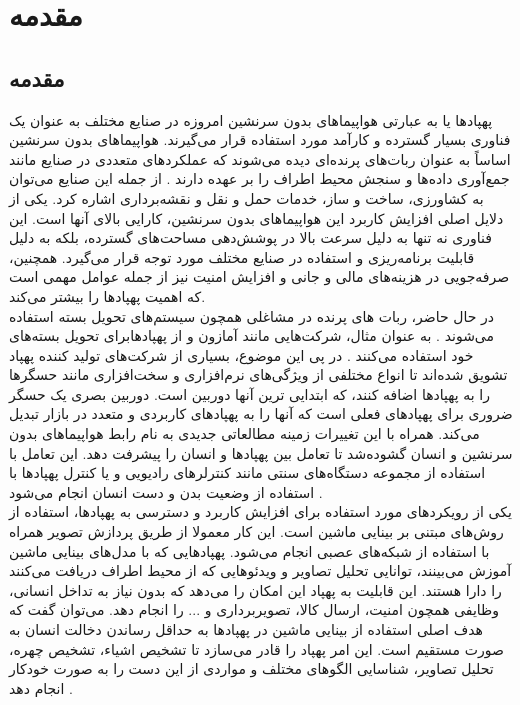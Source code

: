 \chapter{مقدمه}
\section{مقدمه}
پهپاد‌ها یا به عبارتی هواپیماهای بدون سرنشین امروزه در صنایع مختلف به عنوان یک فناوری
 ‌بسیار گسترده و کارآمد مورد استفاده قرار می‌گیرند. هواپیماهای بدون سرنشین اساساً به عنوان ربات‌های پرنده‌ای
 دیده می‌شوند که عملکردهای متعددی در صنایع مانند جمع‌آوری داده‌ها و سنجش محیط اطراف را بر عهده دارند \cite{waltergesture}.
 از جمله این صنایع می‌توان به کشاورزی، ساخت و ساز، خدمات حمل و نقل و نقشه‌برداری اشاره کرد. یکی از دلایل
 اصلی افزایش کاربرد این هواپیما‌های بدون سرنشین، کارایی بالای آنها است. این فناوری نه تنها به دلیل سرعت بالا در پوشش‌دهی
 مساحت‌های گسترده، بلکه به دلیل قابلیت برنامه‌ریزی و استفاده در صنایع مختلف مورد توجه قرار می‌گیرد.
 همچنین، صرفه‌جویی در هزینه‌های مالی و جانی و افزایش امنیت نیز از جمله عوامل مهمی است که اهمیت پهپادها را بیشتر می‌کند\cite{puri2017agriculture}.
 \\
 در حال حاضر، ربات های پرنده در مشاغلی همچون سیستم‌های تحویل بسته استفاده می‌شوند \cite{gatteschi2015new}. به عنوان مثال، شرکت‌هایی مانند آمازون و 
  از پهپادهابرای تحویل بسته‌های خود استفاده می‌کنند \cite{moore2014nypd}. 
 در پی این موضوع، بسیاری از شرکت‌های تولید کننده
  پهپاد تشویق شده‌اند تا انواع مختلفی از ویژگی‌های نرم‌افزاری و سخت‌افزاری
 مانند حسگرها را به پهپاد‌ها اضافه کنند، که ابتدایی ترین
  آنها دوربین است. دوربین بصری یک حسگر ضروری برای پهپادهای فعلی
  است که آنها را به پهپادهای کاربردی و متعدد در بازار تبدیل می‌کند\cite{natarajan2018hand}. همراه با این تغییرات زمینه مطالعاتی جدیدی به نام رابط هواپیماهای بدون سرنشین و
   انسان گشوده‌شد تا تعامل بین پهپاد‌ها و 
 انسان را پیشرفت دهد. این تعامل با استفاده از مجموعه‌ دستگاه‌های سنتی مانند کنترلر‌های رادیویی و یا کنترل پهپادها با استفاده از وضعیت بدن و دست انسان انجام می‌شود \cite{hadri2018hand}.
 \\
 یکی از رویکردهای مورد استفاده برای افزایش کاربرد و دسترسی به پهپادها، استفاده از روش‌های مبتنی بر بینایی ماشین است. این کار معمولا از طریق پردازش تصویر
 همراه با استفاده از شبکه‌های عصبی
 انجام می‌شود. پهپاد‌هایی که با مدل‌های بینایی ماشین آموزش می‌بینند، توانایی تحلیل تصاویر و ویدئو‌هایی که از محیط اطراف
 دریافت می‌کنند را دارا هستند. این قابلیت به پهپاد این امکان را می‌دهد که بدون نیاز به تداخل انسانی، وظایفی همچون امنیت، ارسال کالا، تصویر‌برداری و ... را انجام دهد\cite{zhu2018vision}.
 می‌توان گفت که هدف اصلی استفاده از بینایی ماشین در پهپاد‌ها به حداقل رساندن دخالت انسان به صورت مستقیم است. این
 امر پهپاد را قادر می‌سازد تا تشخیص اشیاء، تشخیص چهره، تحلیل تصاویر، شناسایی الگوهای مختلف و مواردی از این دست را به صورت خودکار انجام دهد \cite{guvenc2018detection}.

